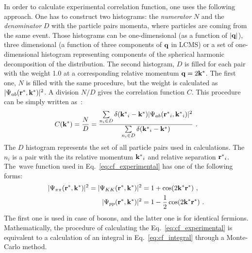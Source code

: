     In order to calculate experimental correlation function, one uses the following approach.
    One has to construct two histograms: the \textit{numerator} $N$ and the \textit{denominator} $D$ with the particle pairs momenta, where particles are coming from the same event.
    Those histograms can be one-dimensional (as a function of $|\mathbf{q}|$), three dimensional (a function of three components of $\mathbf{q}$ in LCMS) or a set of one-dimensional histogram representing components of the spherical harmonic decomposition of the distribution.
    The second histogram, $D$ is filled for each pair with the weight 1.0 at a corresponding relative momentum $\mathbf{q} = 2 \mathbf{k^*}$.
    The first one, $N$ is filled with the same procedure, but the weight is calculated as $|\Psi_{ab}(\mathbf{r^*},\mathbf{k^*})|^2$.
    A division $N/D$ gives the correlation function $C$.
    This procedure can be simply written as~\cite{nonidfemto}:
    \begin{equation}
      \label{eq:cf_experimental}
      C(\mathbf{k^*}) = \frac{N}{D} =  \frac{\sum\limits_{n_i \in D} \delta(\mathbf{k^*}_i - \mathbf{k^*}) |\Psi_{ab}(\mathbf{r^*}_i,\mathbf{k^*}_i)|^2 }{\sum\limits_{n_i \in D} \delta(\mathbf{k^*}_i - \mathbf{k^*})}~.
    \end{equation}
    The $D$ histogram represents the set of all particle pairs used in calculations.
    The~$n_i$ is a pair with the its relative momentum $\mathbf{k^*}_i$ and relative separation $\mathbf{r^*}_i$.
    The~wave function used in Eq.~\ref{eq:cf_experimental} has one of the following forms:
    \begin{align}
      |\Psi_{\pi\pi}(\mathbf{r^*},\mathbf{k^*})|^2 = |\Psi_{KK}(\mathbf{r^*},\mathbf{k^*})|^2 &= 1 + \cos(2 \mathbf{k^*} \mathbf{r^*})~, \\
      |\Psi_{pp}(\mathbf{r^*},\mathbf{k^*})|^2 &= 1 - \frac{1}{2} \cos(2 \mathbf{k^*} \mathbf{r^*})~.
    \end{align}
    The first one is used in case of bosons, and the latter one is for identical fermions.
    Mathematically, the procedure of calculating the Eq.~\ref{eq:cf_experimental} is equivalent to a calculation of an integral in Eq.~\ref{eq:cf_integral} through a Monte-Carlo method.

